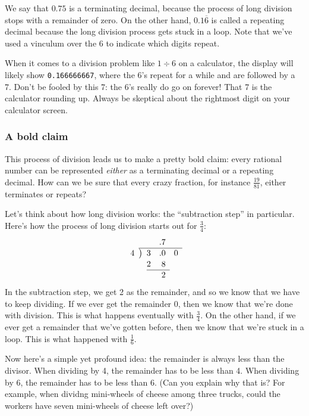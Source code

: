 We say that $0.75$ is a terminating decimal, because the process of long division stops with a remainder of zero. On the other hand, $0.1\overline{6}$ is called a repeating decimal because the long division process gets stuck in a loop. Note that we've used a vinculum over the 6 to indicate which digits repeat.

When it comes to a division problem like $1 \div 6$ on a calculator, the display will likely show \texttt{0.166666667}, where the 6's repeat for a while and are followed by a 7. Don't be fooled by this 7: the 6's really do go on forever! That 7 is the calculator rounding up. Always be skeptical about the rightmost digit on your calculator screen.

\subsubsection{A bold claim}

This process of division leads us to make a pretty bold claim: every rational number can be represented \textit{either} as a terminating decimal or a repeating decimal. How can we be sure that every crazy fraction, for instance $\frac{19}{81}$, either terminates or repeats?

Let's think about how long division works: the ``subtraction step'' in particular. Here's how the process of long division starts out for $\frac{3}{4}$:
\[
\renewcommand\arraystretch{1.1}
\begin{array}{*1r @{\hskip\arraycolsep}c@{\hskip\arraycolsep} *3r}
	&&			& .7	&	\\
\cline{2-5}
4	&\big)&	3	& .0	& 0 \\
	&&		2	&8		\\
\cline{3-4}
	&&			&2 & 	\\
\end{array}
\]
In the subtraction step, we get 2 as the remainder, and so we know that we have to keep dividing. If we ever get the remainder 0, then we know that we're done with division. This is what happens eventually with $\frac{3}{4}$. On the other hand, if we ever get a remainder that we've gotten before, then we know that we're stuck in a loop. This is what happened with $\frac{1}{6}$.

Now here's a simple yet profound idea: the remainder is always less than the divisor. When dividing by 4, the remainder has to be less than 4. When dividing by 6, the remainder has to be less than 6. (Can you explain why that is? For example, when dividng mini-wheels of cheese among three trucks, could the workers have seven mini-wheels of cheese left over?)

